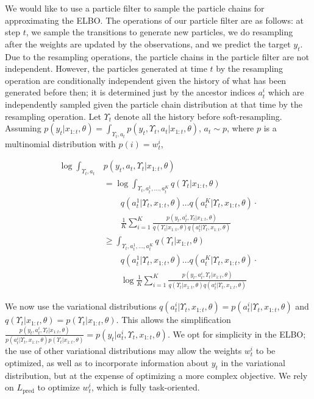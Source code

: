 \documentclass[letterpaper]{article} %
\begin{document}
We would like to use a particle filter to sample the particle chains for approximating the ELBO. The operations of our particle filter are as follows: at step $t$, we sample the transitions to generate new particles, we do resampling after the weights are updated by the observations, and we predict the target $y_t$. Due to the resampling operations, the particle chains in the particle filter are not independent. However, the particles generated at time $t$ by the resampling operation are conditionally independent given the history of what has been generated before then; it is determined just by the ancestor indices $a_t^i$ which are independently sampled given the particle chain distribution at that time by the resampling operation. Let $\Upsilon_{t}$ denote all the history before soft-resampling.
Assuming $p(y_t|x_{1:t},\theta)=\int_{\Upsilon_{t},a_t}p(y_t,\Upsilon_{t},a_t|x_{1:t},\theta)$, $a_t\sim p$, where $p$ is a multinomial distribution with $p(i) = w_t^i$,

\begin{align*}
\log \int_{\Upsilon_{t},a_t}& p(y_t,a_t,\Upsilon_{t}|x_{1:t},\theta)\\
&= \log \int_{\Upsilon_{t},a_t^1,\ldots,a_t^K}q(\Upsilon_{t}|x_{1:t},\theta)\\
&\qquad q(a_t^1|\Upsilon_{t},x_{1:t},\theta)\ldots q(a_t^K|\Upsilon_{t},x_{1:t},\theta)\cdot\\
&\qquad\frac{1}{K}\sum_{i=1}^K  \frac{p(y_t,a_t^i,\Upsilon_{t}|x_{1:t},\theta)}{q(\Upsilon_{t}|x_{1:t},\theta)q(a_t^i|\Upsilon_{t},x_{1:t},\theta)}\\
&\geq \int_{\Upsilon_{t},a_t^1,\ldots,a_t^K}q(\Upsilon_{t}|x_{1:t},\theta)\\
&\qquad q(a_t^1|\Upsilon_{t},x_{1:t},\theta)\ldots q(a_t^K|\Upsilon_{t},x_{1:t},\theta)\cdot\\ 
&\qquad \log \frac{1}{K}\sum_{i=1}^K  \frac{p(y_t,a_t^i,\Upsilon_{t}|x_{1:t},\theta)}{q(\Upsilon_{t}|x_{1:t},\theta)q(a_t^i|\Upsilon_{t},x_{1:t},\theta)}
\end{align*}

We now use the variational distributions $q(a_t^i|\Upsilon_{t}, x_{1:t},\theta)=p(a_t^i|\Upsilon_{t},x_{1:t},\theta)$ and $q(\Upsilon_{t}|x_{1:t},\theta) = p(\Upsilon_{t}|x_{1:t},\theta)$. This allows the simplification $\frac{p(y_t,a_t^i,\Upsilon_{t}|x_{1:t},\theta)}{p(a_t^i|\Upsilon_{t},x_{1:t},\theta)p(\Upsilon_{t}|x_{1:t},\theta)}=p(y_t|a_t^i,\Upsilon_{t},x_{1:t},\theta)$. We opt for simplicity in the ELBO; the use of other variational distributions may allow the weights $w_t^i$ to be optimized, as well as to incorporate information about $y_t$ in the variational distribution, but at the expense of optimizing a more complex objective. We rely on $L_\mathrm{pred}$ to optimize $w_t^i$, which is fully task-oriented. 
\end{document}
